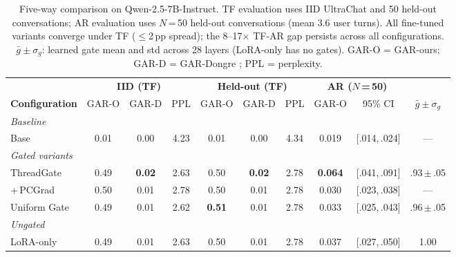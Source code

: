 \begin{table}[!t]
\centering
\small
\caption{Five-way comparison on Qwen-2.5-7B-Instruct. TF evaluation uses IID UltraChat and 50 held-out conversations; AR evaluation uses $N$\,=\,50 held-out conversations (mean 3.6 user turns). All fine-tuned variants converge under TF ($\leq$2\,pp spread); the 8--17$\times$ TF-AR gap persists across all configurations. $\bar{g}\!\pm\!\sigma_g$: learned gate mean and std across 28 layers (LoRA-only has no gates). GAR-O = GAR-ours; GAR-D = GAR-Dongre \citep{dongre2026attention}; PPL = perplexity.}
\label{tab:five-way}
\begin{tabular}{l ccc ccc cc c}
\toprule
& \multicolumn{3}{c}{\textbf{IID (TF)}} & \multicolumn{3}{c}{\textbf{Held-out (TF)}} & \multicolumn{2}{c}{\textbf{AR ($N$\,=\,50)}} & \\
\cmidrule(lr){2-4} \cmidrule(lr){5-7} \cmidrule(lr){8-9}
\textbf{Configuration} & GAR-O & GAR-D & PPL & GAR-O & GAR-D & PPL & GAR-O & 95\% CI & $\bar{g}\!\pm\!\sigma_g$ \\
\midrule
\multicolumn{10}{l}{\emph{Baseline}} \\
Base              & 0.01 & 0.00 & 4.23 & 0.01 & 0.00 & 4.34 & 0.019 & {\scriptsize[.014,\,.024]} & --- \\
\midrule
\multicolumn{10}{l}{\emph{Gated variants}} \\
ThreadGate        & 0.49 & \textbf{0.02} & 2.63 & 0.50 & \textbf{0.02} & 2.78 & \textbf{0.064} & {\scriptsize[.041,\,.091]} & .93\,{\scriptsize$\pm$\,.05} \\
\;+\,PCGrad       & 0.50 & 0.01 & 2.78 & 0.50 & 0.01 & 2.78 & 0.030 & {\scriptsize[.023,\,.038]} & --- \\
Uniform Gate      & 0.49 & 0.01 & 2.62 & \textbf{0.51} & 0.01 & 2.78 & 0.033 & {\scriptsize[.025,\,.043]} & .96\,{\scriptsize$\pm$\,.05} \\
\midrule
\multicolumn{10}{l}{\emph{Ungated}} \\
LoRA-only         & 0.49 & 0.01 & 2.63 & 0.50 & 0.01 & 2.78 & 0.037 & {\scriptsize[.027,\,.050]} & 1.00 \\
\bottomrule
\end{tabular}
\end{table}
